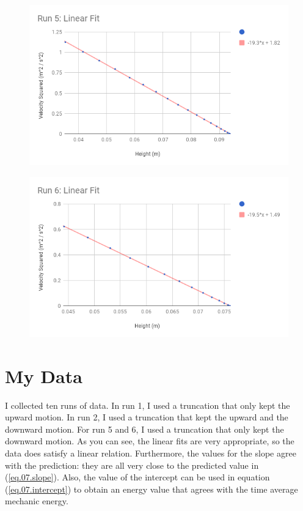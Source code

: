 \begin{figure}
    \centering
    \includegraphics[scale=0.71]{image/07-mechanic/run-5-fit.png}
    \caption{}
    \label{figure.07.run.5.fit}
\end{figure}
\begin{figure}
    \centering
    \includegraphics[scale=0.71]{image/07-mechanic/run-6-fit.png}
    \caption{}
    \label{figure.07.run.6.fit}
\end{figure}
\section{My Data}
I collected ten runs of data. In run 1, I used a truncation that only kept the upward motion. In run 2, I used a truncation that kept the upward and the downward motion. For run 5 and 6, I used a truncation that only kept the downward motion. As you can see, the linear fits are very appropriate, so the data does satisfy a linear relation. Furthermore, the values for the slope agree with the prediction: they are all very close to the predicted value in (\ref{eq.07.slope}). Also, the value of the intercept can be used in equation (\ref{eq.07.intercept}) to obtain an energy value that agrees with the time average mechanic energy.

